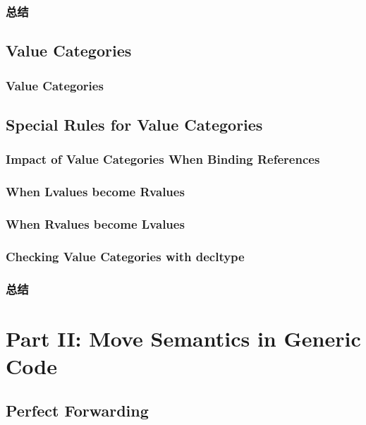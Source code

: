 \documentclass[11pt,a4paper,UTF8]{ctexart}
\begin{document}
		\subsubsection{总结}
	\subsection{Value Categories}
		\subsubsection{Value Categories}
		\subsection{Special Rules for Value Categories}
		\subsubsection{Impact of Value Categories When Binding References}
		\subsubsection{When Lvalues become Rvalues}
		\subsubsection{When Rvalues become Lvalues}
		\subsubsection{Checking Value Categories with decltype}
		\subsubsection{总结}
		
	\section{Part II: Move Semantics in Generic Code}
	\subsection{Perfect Forwarding}
\end{document}
